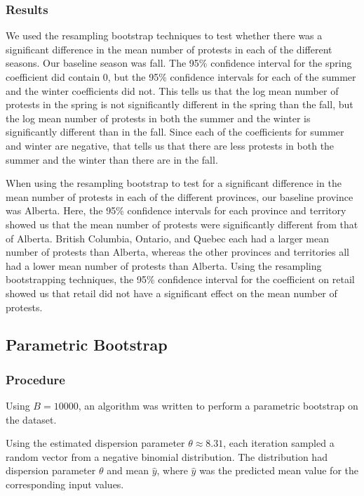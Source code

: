 \documentclass[12pt]{article}
\begin{document}
\subsubsection*{Results}
We used the resampling bootstrap techniques to test whether there was a significant difference in the mean number of protests in each of the different seasons. Our baseline season was fall. The 95\% confidence interval for the spring coefficient did contain 0, but the 95\% confidence intervals for each of the summer and the winter coefficients did not. This tells us that the log mean number of protests in the spring is not significantly different in the spring than the fall, but the log mean number of protests in both the summer and the winter is significantly different than in the fall. Since each of the coefficients for summer and winter are negative, that tells us that there are less protests in both the summer and the winter than there are in the fall.

When using the resampling bootstrap to test for a significant difference in the mean number of protests in each of the different provinces, our baseline province was Alberta. Here, the 95\% confidence intervals for each province and territory showed us that the mean number of protests were significantly different from that of Alberta. British Columbia, Ontario, and Quebec each had a larger mean number of protests than Alberta, whereas the other provinces and territories all had a lower mean number of protests than Alberta.
Using the resampling bootstrapping techniques, the 95\% confidence interval for the coefficient on retail showed us that retail did not have a significant effect on the mean number of protests.



\newpage
\subsection{Parametric Bootstrap}
\subsubsection*{Procedure}
Using $B = 10000$, an algorithm was written to perform a parametric bootstrap on the dataset.

Using the estimated dispersion parameter $\theta \approx 8.31$, each iteration sampled a random vector from a negative binomial distribution. The distribution had dispersion parameter $\theta$ and mean $\hat y$, where $\hat y$ was the predicted mean value for the corresponding input values.
\end{document}
